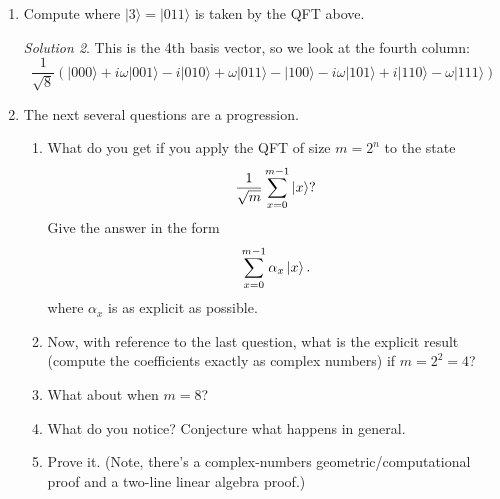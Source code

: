 \documentclass{article}
\theoremstyle{plain}
\theoremstyle{definition}
\theoremstyle{remark}
\newtheorem*{solution}{Solution}
\numberwithin{theorem}{section}
\begin{document}
\begin{enumerate}
\begin{solution}
				\[
					\frac{1}{\sqrt{8}}
					\begin{pmatrix}
						1 & 1 & 1 & 1 & 1 & 1 & 1 & 1 \\
						1 & \omega & i & i\omega & -1 & -\omega & -i & -i\omega \\
						1 & i & -1 & -i & 1 & i & -1 & -i \\
						1 & i\omega & -i & \omega & -1 & -i\omega & i & -\omega \\
						1 & -1 & 1 & -1 & 1 & -1 & 1 & -1 \\
						1 & -\omega & i & -i\omega & -1 & \omega & -i & i\omega \\
						1 & -i & -1 & i & 1 & -i & -1 & i \\
						1 & -i\omega & -i & -\omega & -1 & i\omega & i & \omega \\
					\end{pmatrix}
					\]
				\end{solution}

			\item Compute where $|3\rangle = |011\rangle$ is taken by the QFT above.

				\begin{solution}

				This is the 4th basis vector, so we look at the fourth column:
				\[
					\frac{1}{\sqrt{8}} \left(
					|000\rangle
					+i \omega |001\rangle
					- i |010\rangle
					 +\omega |011\rangle
					-|100\rangle
					- i \omega |101\rangle
					+ i |110\rangle
					- \omega |111\rangle
				\right)
				\]
				\end{solution}

 
			\item The next several questions are a progression.

		\begin{enumerate}
			\item What do you get if you apply the QFT of size $m = 2^n$ to the state
				\[
					\frac{1}{\sqrt{m}}\sum_{x=0}^{m-1} \ket{x}?
				\]
			      Give the answer in the form
				\[
					\sum_{x=0}^{m-1} \alpha_x \ket{x}.
				\]
				where $\alpha_x$ is as explicit as possible.
			\item Now, with reference to the last question, what is the explicit result (compute the coefficients exactly as complex numbers) if $m = 2^2 = 4$?
			\item What about when $m=8$?
			\item What do you notice?  Conjecture what happens in general.
			\item Prove it.  (Note, there's a complex-numbers geometric/computational proof and a two-line linear algebra proof.)
		\end{enumerate}


\end{enumerate}
\end{document}
